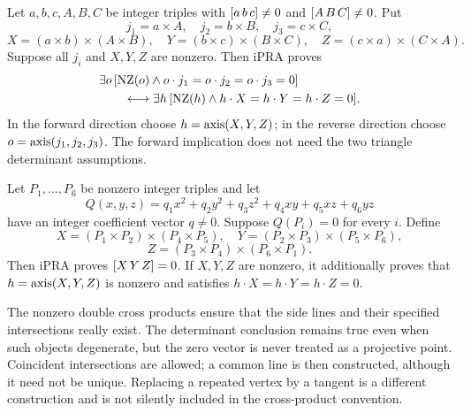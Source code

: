 \begin{theorem}\label{thm:des-summary}
Let $a,b,c,A,B,C$ be integer triples with
$[a\,b\,c]\ne0$ and $[A\,B\,C]\ne0$. Put
\[
 j_1=a\times A,\quad j_2=b\times B,\quad j_3=c\times C,
\]
\[
 X=(a\times b)\times(A\times B),\quad
 Y=(b\times c)\times(B\times C),\quad
 Z=(c\times a)\times(C\times A).
\]
Suppose all $j_i$ and $X,Y,Z$ are nonzero. Then iPRA proves
\begin{align*}
 &\exists o\,[\operatorname{NZ}(o)\land o\cdot j_1=o\cdot j_2=o\cdot j_3=0]\\
 &\qquad\longleftrightarrow
 \exists h\,[\operatorname{NZ}(h)\land h\cdot X=h\cdot Y=h\cdot Z=0].
\end{align*}
In the forward direction choose $h=\operatorname{axis}(X,Y,Z)$; in the reverse
direction choose $o=\operatorname{axis}(j_1,j_2,j_3)$. The forward implication does not
need the two triangle determinant assumptions.
\end{theorem}

\begin{theorem}\label{thm:pas-summary}
Let $P_1,\ldots,P_6$ be nonzero integer triples and let
\[
 Q(x,y,z)=q_1x^2+q_2y^2+q_3z^2+q_4xy+q_5xz+q_6yz
\]
have an integer coefficient vector $q\ne0$. Suppose $Q(P_i)=0$ for every
$i$. Define
\[
 X=(P_1\times P_2)\times(P_4\times P_5),\quad
 Y=(P_2\times P_3)\times(P_5\times P_6),
\]
\[
 Z=(P_3\times P_4)\times(P_6\times P_1).
\]
Then iPRA proves $[X\,Y\,Z]=0$. If $X,Y,Z$ are nonzero, it additionally
proves that $h=\operatorname{axis}(X,Y,Z)$ is nonzero and satisfies
$h\cdot X=h\cdot Y=h\cdot Z=0$.
\end{theorem}

The nonzero double cross products ensure that the side lines and their
specified intersections really exist. The determinant conclusion remains
true even when such objects degenerate, but the zero vector is never
treated as a projective point. Coincident intersections are allowed; a
common line is then constructed, although it need not be unique.
Replacing a repeated vertex by a tangent is a different construction and
is not silently included in the cross-product convention.

